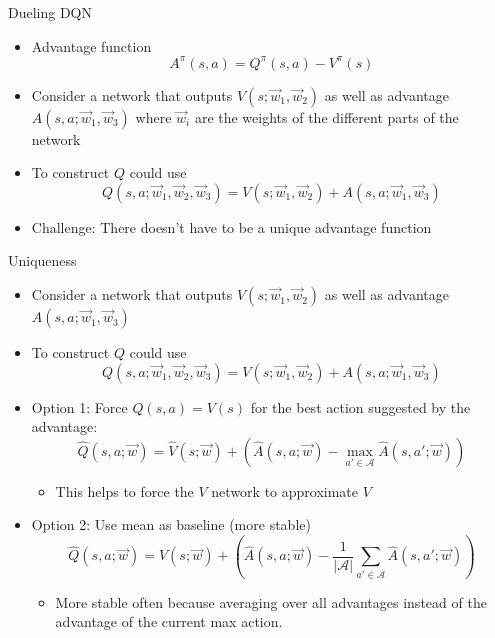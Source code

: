 \begin{frame}[c]{Dueling DQN }
	
	\begin{itemize}
	\item Advantage function 
	$$A^\pi (s,a) = Q^\pi(s,a) - V^\pi(s) $$
	\item Consider a network that outputs $V(s; \vec{w}_1, \vec{w}_2)$ as well as advantage $A(s,a; \vec{w}_1, \vec{w}_3)$ where $\vec{w}_i$ are the weights of the different parts of the network
	\item To construct $Q$ could use $$Q(s,a;\vec{w}_1, \vec{w}_2, \vec{w}_3) = V(s;\vec{w}_1, \vec{w}_2) + A(s,a;\vec{w}_1, \vec{w}_3)$$
	\bigskip
	\pause
	\item Challenge: There doesn't have to be a unique advantage function

	\end{itemize}
	
\end{frame}
\begin{frame}[c]{Uniqueness}
	
	\begin{itemize}
		\item Consider a network that outputs $V(s;\vec{w}_1, \vec{w}_2)$ as well as advantage $A(s,a; \vec{w}_1, \vec{w}_3)$
		\item To construct $Q$ could use $$Q(s,a;\vec{w}_1, \vec{w}_2, \vec{w}_3) = V(s;\vec{w}_1, \vec{w}_2) + A(s,a;\vec{w}_1, \vec{w}_3)$$
		\item Option 1: Force $Q(s,a) = V(s)$ for the best action suggested by the advantage:
		$$\hat{Q}(s,a;\vec{w}) = \hat{V}(s;\vec{w}) + \left( \hat{A}(s,a;\vec{w}) - \max_{a' \in \mathcal{A}} \hat{A}(s,a';\vec{w}) \right) $$
		\vspace{-1em}
		\begin{itemize}
			\item This helps to force the $V$ network to approximate $V$
		\end{itemize}
		\item Option 2: Use mean as baseline (more stable)
		$$\hat{Q}(s,a;\vec{w}) = \hat{V}(s;\vec{w}) + \left( \hat{A}(s,a;\vec{w}) - \frac{1}{|\mathcal{A}|} \sum_{a' \in \mathcal{A}} \hat{A}(s,a';\vec{w}) \right) $$
		\vspace{-1em}
		\begin{itemize}
			\item More stable often because averaging over all advantages instead of
			the advantage of the current max action.
		\end{itemize}
	\end{itemize}
	
\end{frame}

